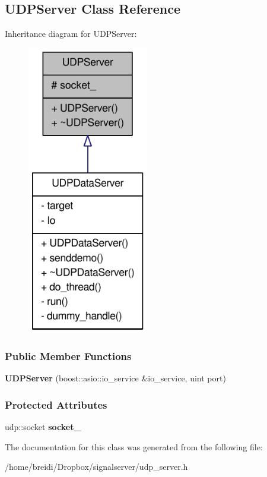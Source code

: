 \hypertarget{class_u_d_p_server}{
\subsection{UDPServer Class Reference}
\label{class_u_d_p_server}
}
Inheritance diagram for UDPServer:\nopagebreak
\begin{figure}[H]
\begin{center}
\leavevmode
\includegraphics[width=150pt]{class_u_d_p_server__inherit__graph}
\end{center}
\end{figure}
\subsubsection*{Public Member Functions}
\begin{DoxyCompactItemize}
\item 
\hypertarget{class_u_d_p_server_a63b9e7f6705979a0d1946be48743e7ef}{
{\bfseries UDPServer} (boost::asio::io\_\-service \&io\_\-service, uint port)}
\label{class_u_d_p_server_a63b9e7f6705979a0d1946be48743e7ef}

\end{DoxyCompactItemize}
\subsubsection*{Protected Attributes}
\begin{DoxyCompactItemize}
\item 
\hypertarget{class_u_d_p_server_a1f0886504adc5aad8db052c38b1f4ee1}{
udp::socket {\bfseries socket\_\-}}
\label{class_u_d_p_server_a1f0886504adc5aad8db052c38b1f4ee1}

\end{DoxyCompactItemize}


The documentation for this class was generated from the following file:\begin{DoxyCompactItemize}
\item 
/home/breidi/Dropbox/signalserver/udp\_\-server.h\end{DoxyCompactItemize}
